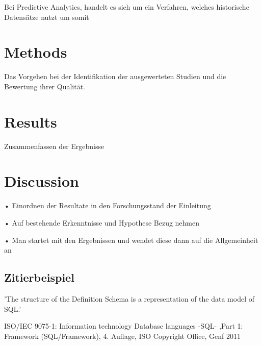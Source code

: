 \documentclass[12pt,twocolumn,twoside]{conference}   %
\begin{document}
Bei Predictive Analytics, handelt es sich um ein Verfahren, welches historische Datensätze nutzt um somit 


\section{Methods}
\begin{list}{•}
\item Das Vorgehen bei der Identifikation der ausgewerteten Studien und die Bewertung ihrer Qualität.
\end{list}


\section{Results}
\begin{list}{•}
\item Zusammenfassen der Ergebnisse
\end{list}


\section{Discussion}
\begin{list}{•}
\item[•] Einordnen der Resultate in den Forschungsstand der Einleitung
\item[•] Auf bestehende Erkenntnisse und Hypothese Bezug nehmen
\item[•] Man startet mit den Ergebnissen und wendet diese dann auf die Allgemeinheit an
\end{list}


\subsection{Zitierbeispiel}
'The structure of the Definition Schema is a representation of the data model of SQL.' \cite{ISO9075-1:2011}


\newpage

\begin{thebibliography}{99}
	
	ISO/IEC 9075-1: Information technology
	Database languages -SQL- ,Part 1: Framework
	(SQL/Framework), 4. Auflage, ISO Copyright Office,
	Genf 2011
	
	
\end{thebibliography}
\end{document}
